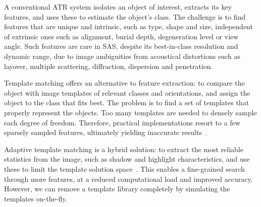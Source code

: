  

A conventional ATR system isolates an object of interest, extracts its key features, and uses these to estimate the object's class. The challenge is to find features that are unique and intrinsic, such as type, shape and size, independent of extrinsic ones such as alignment, burial depth, degeneration level or view angle. Such features are rare in SAS, despite its best-in-class resolution and dynamic range, due to image ambiguities from acoustical distortions such as layover, multiple scattering, diffraction, dispersion and penetration.


Template matching offers an alternative to feature extraction: to compare the object with image templates of relevant classes and orientations, and assign the object to the class that fits best. The problem is to find a set of templates that properly represent the objects. Too many templates are needed to densely sample each degree of freedom. Therefore, practical implementations resort to a few sparsely sampled features, ultimately yielding inaccurate results~\cite{Midelfart2010}.


Adaptive template matching is a hybrid solution: to extract the most reliable statistics from the image, such as shadow and highlight characteristics, and use these to limit the template solution space~\cite{Midelfart2010}. This enables a fine-grained search through more features, at a reduced computational load and improved accuracy. However, we can remove a template library completely by simulating the templates on-the-fly.



